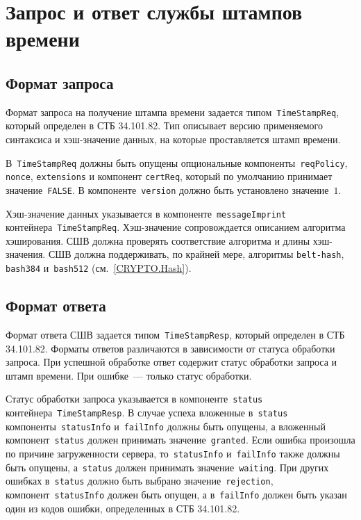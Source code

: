 \section{Запрос и ответ службы штампов времени}\label{FMT.TSP}

\subsection{Формат запроса}

Формат запроса на получение штампа времени задается 
типом~\texttt{TimeStampReq}, который определен в СТБ 34.101.82. Тип 
описывает версию применяемого синтаксиса и хэш-значение данных, на которые 
проставляется штамп времени.

В~\texttt{TimeStampReq} должны быть опущены опциональные 
компоненты~\texttt{reqPolicy}, \texttt{nonce}, \texttt{extensions} и компонент 
\texttt{certReq}, который по умолчанию принимает значение~\texttt{FALSE}. 
%
В компоненте~\texttt{version} должно быть установлено значение~$1$.

Хэш-значение данных указывается в компоненте~\texttt{messageImprint}
контейнера~\texttt{TimeStampReq}.
Хэш-значение сопровождается описанием алгоритма хэширования.
СШВ должна проверять соответствие алгоритма и длины хэш-значения.
СШВ должна поддерживать, по крайней мере, алгоритмы \texttt{belt-hash},
\texttt{bash384} и~\texttt{bash512} (см.~\ref{CRYPTO.Hash}).

\subsection{Формат ответа}
 
Формат ответа СШВ задается типом~\texttt{TimeStampResp}, который определен 
в СТБ 34.101.82. Форматы ответов различаются в зависимости от статуса 
обработки запроса. При успешной обработке ответ содержит статус обработки 
запроса и штамп времени. При ошибке~--- только статус обработки.

Статус обработки запроса указывается в компоненте~\texttt{status}
контейнера~\texttt{TimeStampResp}.
%
В случае успеха вложенные в~\texttt{status} компоненты~\texttt{statusInfo} 
и~\texttt{failInfo} должны быть опущены, а вложенный
компонент~\texttt{status} должен принимать значение~\texttt{granted}.
%
Если ошибка произошла по причине загруженности сервера, 
то~\texttt{statusInfo} и~\texttt{failInfo} также должны быть опущены, 
а~\texttt{status} должен принимать значение~\texttt{waiting}.
%
При других ошибках в~\texttt{status} должно быть выбрано 
значение~\texttt{rejection}, компонент~\texttt{statusInfo}
должен быть опущен, а в~\texttt{failInfo} должен быть указан один из 
кодов ошибки, определенных в СТБ 34.101.82.

